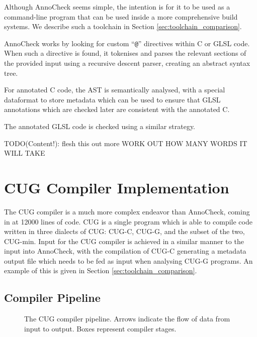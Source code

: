\documentclass[a4paper,12pt,twoside,openright]{report}
\def\compilerloccount{12000 }
\begin{document}
Although AnnoCheck seems simple, the intention is for it to be used as a
command-line program that can be used inside a more comprehensive build
systems. We describe such a toolchain in Section \ref{sec:toolchain_comparison}.

AnnoCheck works by looking for custom ``\texttt{@}'' directives within C or
GLSL code. When such a directive is found, it tokenises and parses the relevant
sections of the provided input using a recursive descent parser, creating an
abstract syntax tree.

For annotated C code, the AST is semantically analysed, with a special
dataformat to store metadata which can be used to ensure that GLSL annotations
which are checked later are consistent with the annotated C.

The annotated GLSL code is checked using a similar strategy.

TODO(Content!): flesh this out more WORK OUT HOW MANY WORDS IT WILL TAKE

\section{CUG Compiler Implementation}

The CUG compiler is a much more complex endeavor than AnnoCheck, coming in at
\compilerloccount lines of code. CUG is a single program which is able to
compile code written in three dialects of CUG: CUG-C, CUG-G, and the subset of
the two, CUG-min. Input for the CUG compiler is achieved in a similar manner to
the input into AnnoCheck, with the compilation of CUG-C generating a metadata
output file which needs to be fed as input when analysing CUG-G programs. An
example of this is given in Section \ref{sec:toolchain_comparison}.

\subsection{Compiler Pipeline}

\label{sec:compiler_pipeline}

\begin{figure}[h]
\centering
\def\svgwidth{\linewidth}
\scriptsize{}
\caption{The CUG compiler pipeline. Arrows indicate the flow of data from
input to output. Boxes represent compiler stages.}
\label{fig:cug_compiler_pipeline}
\end{figure}
\end{document}
